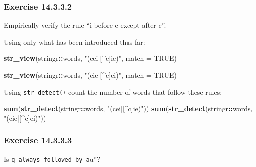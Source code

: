 \documentclass[]{book}
\newenvironment{Shaded}{\begin{snugshade}}{\end{snugshade}}
\newcommand{\DataTypeTok}[1]{\textcolor[rgb]{0.13,0.29,0.53}{#1}}
\newcommand{\KeywordTok}[1]{\textcolor[rgb]{0.13,0.29,0.53}{\textbf{#1}}}
\newcommand{\NormalTok}[1]{#1}
\newcommand{\OperatorTok}[1]{\textcolor[rgb]{0.81,0.36,0.00}{\textbf{#1}}}
\newcommand{\OtherTok}[1]{\textcolor[rgb]{0.56,0.35,0.01}{#1}}
\newcommand{\StringTok}[1]{\textcolor[rgb]{0.31,0.60,0.02}{#1}}
\theoremstyle{plain}
\theoremstyle{remark}
\begin{document}
\hypertarget{exercise-14.3.3.2}{%
\subsubsection*{\texorpdfstring{Exercise
{14.3.3.2}}{Exercise 14.3.3.2}}\label{exercise-14.3.3.2}}

Empirically verify the rule ``i before e except after c''.

Using only what has been introduced thus far:

\begin{Shaded}
\begin{Highlighting}[]
\KeywordTok{str_view}\NormalTok{(stringr}\OperatorTok{::}\NormalTok{words, }\StringTok{"(cei|[^c]ie)"}\NormalTok{, }\DataTypeTok{match =} \OtherTok{TRUE}\NormalTok{)}
\end{Highlighting}
\end{Shaded}

\begin{Shaded}
\begin{Highlighting}[]
\KeywordTok{str_view}\NormalTok{(stringr}\OperatorTok{::}\NormalTok{words, }\StringTok{"(cie|[^c]ei)"}\NormalTok{, }\DataTypeTok{match =} \OtherTok{TRUE}\NormalTok{)}
\end{Highlighting}
\end{Shaded}

Using \texttt{str\_detect()} count the number of words that follow these
rules:

\begin{Shaded}
\begin{Highlighting}[]
\KeywordTok{sum}\NormalTok{(}\KeywordTok{str_detect}\NormalTok{(stringr}\OperatorTok{::}\NormalTok{words, }\StringTok{"(cei|[^c]ie)"}\NormalTok{))}
\KeywordTok{sum}\NormalTok{(}\KeywordTok{str_detect}\NormalTok{(stringr}\OperatorTok{::}\NormalTok{words, }\StringTok{"(cie|[^c]ei)"}\NormalTok{))}
\end{Highlighting}
\end{Shaded}

\hypertarget{exercise-14.3.3.3}{%
\subsubsection*{\texorpdfstring{Exercise
{14.3.3.3}}{Exercise 14.3.3.3}}\label{exercise-14.3.3.3}}

Is
\texttt{q\textquotesingle{}\textquotesingle{}\ always\ followed\ by\ a}u''?
\end{document}
